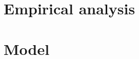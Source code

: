 \documentclass{article}
\begin{document}








\section{Empirical analysis}





\section{Model}

\end{document}
